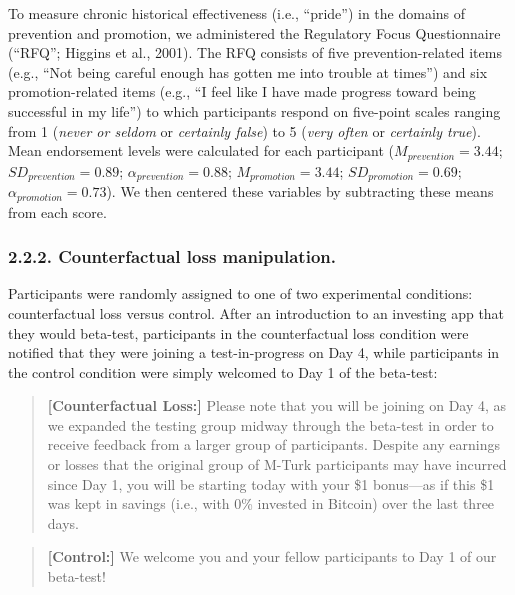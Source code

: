 \documentclass[man,floatsintext]{apa6}
\begin{document}
To measure chronic historical effectiveness (i.e., \enquote{pride}) in the domains of prevention and promotion, we administered the Regulatory Focus Questionnaire (``RFQ''; Higgins et al., 2001). The RFQ consists of five prevention-related items (e.g., \enquote{Not being careful enough has gotten me into trouble at times}) and six promotion-related items (e.g., \enquote{I feel like I have made progress toward being successful in my life}) to which participants respond on five-point scales ranging from 1 (\emph{never or seldom} or \emph{certainly false}) to 5 (\emph{very often} or \emph{certainly true}). Mean endorsement levels were calculated for each participant (\(M_{prevention} = 3.44\); \(SD_{prevention} = 0.89\); \(\alpha_{prevention} = 0.88\); \(M_{promotion} = 3.44\); \(SD_{promotion} = 0.69\); \(\alpha_{promotion} = 0.73\)). We then centered these variables by subtracting these means from each score.

\hypertarget{counterfactual-loss-manipulation.}{%
\subsubsection{2.2.2. Counterfactual loss manipulation.}\label{counterfactual-loss-manipulation.}}

Participants were randomly assigned to one of two experimental conditions: counterfactual loss versus control. After an introduction to an investing app that they would beta-test, participants in the counterfactual loss condition were notified that they were joining a test-in-progress on Day 4, while participants in the control condition were simply welcomed to Day 1 of the beta-test:

\begin{quote}
\textbf{{[}Counterfactual Loss:{]}} Please note that you will be joining on Day 4, as we expanded the testing group midway through the beta-test in order to receive feedback from a larger group of participants. Despite any earnings or losses that the original group of M-Turk participants may have incurred since Day 1, you will be starting today with your \$1 bonus---as if this \$1 was kept in savings (i.e., with 0\% invested in Bitcoin) over the last three days.
\end{quote}

\begin{quote}
\textbf{{[}Control:{]}} We welcome you and your fellow participants to Day 1 of our beta-test!
\end{quote}
\end{document}
